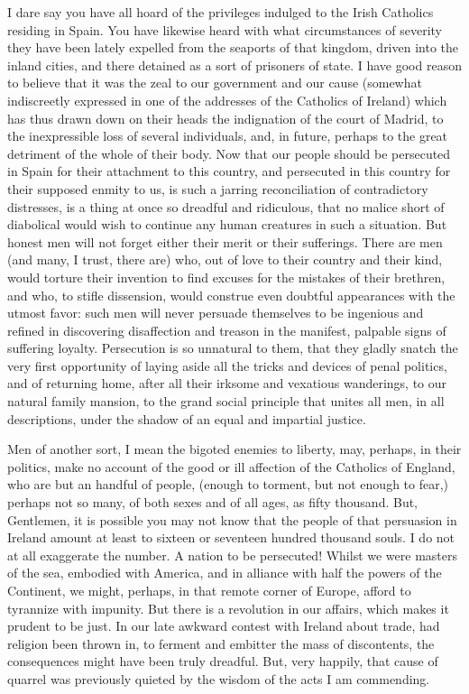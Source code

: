 I dare say you have all hoard of the privileges indulged to the Irish Catholics residing in Spain. You have likewise heard with what circumstances of severity they have been lately expelled from the seaports of that kingdom, driven into the inland cities, and there detained as a sort of prisoners of state. I have good reason to believe that it was the zeal to our government and our cause (somewhat indiscreetly expressed in one of the addresses of the Catholics of Ireland) which has thus drawn down on their heads the indignation of the court of Madrid, to the inexpressible loss of several individuals, and, in future, perhaps to the great detriment of the whole of their body. Now that our people should be persecuted in Spain for their attachment to this country, and persecuted in this country for their supposed enmity to us, is such a jarring reconciliation of contradictory distresses, is a thing at once so dreadful and ridiculous, that no malice short of diabolical would wish to continue any human creatures in such a situation. But honest men will not forget either their merit or their sufferings. There are men (and many, I trust, there are) who, out of love to their country and their kind, would torture their invention to find excuses for the mistakes of their brethren, and who, to stifle dissension, would construe even doubtful appearances with the utmost favor: such men will never persuade themselves to be ingenious and refined in discovering disaffection and treason in the manifest, palpable signs of suffering loyalty. Persecution is so unnatural to them, that they gladly snatch the very first opportunity of laying aside all the tricks and devices of penal politics, and of returning home, after all their irksome and vexatious wanderings, to our natural family mansion, to the grand social principle that unites all men, in all descriptions, under the shadow of an equal and impartial justice.

Men of another sort, I mean the bigoted enemies to liberty, may, perhaps, in their politics, make no account of the good or ill affection of the Catholics of England, who are but an handful of people, (enough to torment, but not enough to fear,) perhaps not so many, of both sexes and of all ages, as fifty thousand. But, Gentlemen, it is possible you may not know that the people of that persuasion in Ireland amount at least to sixteen or seventeen hundred thousand souls. I do not at all exaggerate the number. A nation to be persecuted! Whilst we were masters of the sea, embodied with America, and in alliance with half the powers of the Continent, we might, perhaps, in that remote corner of Europe, afford to tyrannize with impunity. But there is a revolution in our affairs, which makes it prudent to be just. In our late awkward contest with Ireland about trade, had religion been thrown in, to ferment and embitter the mass of discontents, the consequences might have been truly dreadful. But, very happily, that cause of quarrel was previously quieted by the wisdom of the acts I am commending.

